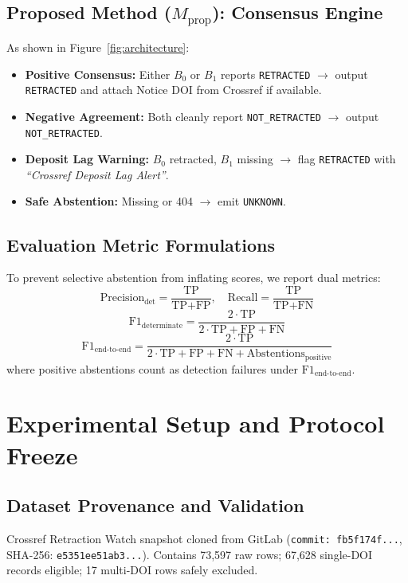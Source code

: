 \documentclass[10pt,a4paper,twocolumn]{article}
\begin{document}
\subsection{Proposed Method ($M_{\text{prop}}$): Consensus Engine}
As shown in Figure~\ref{fig:architecture}:
\begin{itemize}
    \item \textbf{Positive Consensus:} Either $B_0$ or $B_1$ reports \texttt{RETRACTED} $\rightarrow$ output \texttt{RETRACTED} and attach Notice DOI from Crossref if available.
    \item \textbf{Negative Agreement:} Both cleanly report \texttt{NOT\_RETRACTED} $\rightarrow$ output \texttt{NOT\_RETRACTED}.
    \item \textbf{Deposit Lag Warning:} $B_0$ retracted, $B_1$ missing $\rightarrow$ flag \texttt{RETRACTED} with \emph{``Crossref Deposit Lag Alert''}.
    \item \textbf{Safe Abstention:} Missing or 404 $\rightarrow$ emit \texttt{UNKNOWN}.
\end{itemize}

\subsection{Evaluation Metric Formulations}
To prevent selective abstention from inflating scores, we report dual metrics:
\begin{equation}
\text{Precision}_{\text{det}} = \frac{\text{TP}}{\text{TP} + \text{FP}}, \quad \text{Recall} = \frac{\text{TP}}{\text{TP} + \text{FN}}
\end{equation}
\begin{equation}
\text{F1}_{\text{determinate}} = \frac{2 \cdot \text{TP}}{2 \cdot \text{TP} + \text{FP} + \text{FN}}
\end{equation}
\begin{equation}
\text{F1}_{\text{end-to-end}} = \frac{2 \cdot \text{TP}}{2 \cdot \text{TP} + \text{FP} + \text{FN} + \text{Abstentions}_{\text{positive}}}
\end{equation}
where positive abstentions count as detection failures under $\text{F1}_{\text{end-to-end}}$.

\section{Experimental Setup and Protocol Freeze}

\subsection{Dataset Provenance and Validation}
Crossref Retraction Watch snapshot cloned from GitLab (\texttt{commit: fb5f174f...}, SHA-256: \texttt{e5351ee51ab3...}). Contains 73,597 raw rows; 67,628 single-DOI records eligible; 17 multi-DOI rows safely excluded.
\end{document}
